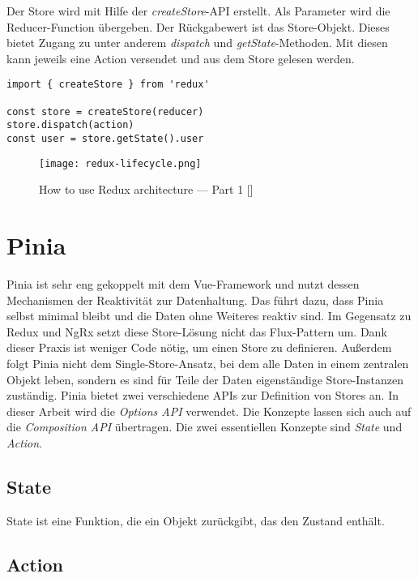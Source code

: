 Der Store wird mit Hilfe der \textit{createStore}-API erstellt. Als Parameter wird die Reducer-Function übergeben. Der Rückgabewert ist das Store-Objekt. Dieses bietet Zugang zu unter anderem \textit{dispatch} und \textit{getState}-Methoden. Mit diesen kann jeweils eine Action versendet und aus dem Store gelesen werden.

\begin{lstlisting}
import { createStore } from 'redux'

const store = createStore(reducer)
store.dispatch(action)
const user = store.getState().user
\end{lstlisting}

\begin{figure}[H]
  \texttt{[image: redux-lifecycle.png]}
  \caption{How to use Redux architecture — Part 1 [\citeyear{reduxDataFlow}]}
  \label{fig:redux-lifecycle}
\end{figure}

\section{Pinia}

Pinia ist sehr eng gekoppelt mit dem Vue-Framework und nutzt dessen Mechanismen der Reaktivität zur Datenhaltung. Das führt dazu, dass Pinia selbst minimal bleibt und die Daten ohne Weiteres reaktiv sind. Im Gegensatz zu Redux und NgRx setzt diese Store-Lösung nicht das Flux-Pattern um. Dank dieser Praxis ist weniger Code nötig, um einen Store zu definieren. Außerdem folgt Pinia nicht dem Single-Store-Ansatz, bei dem alle Daten in einem zentralen Objekt leben, sondern es sind für Teile der Daten eigenständige Store-Instanzen zuständig. Pinia bietet zwei verschiedene APIs zur Definition von Stores an. In dieser Arbeit wird die \textit{Options API} verwendet. Die Konzepte lassen sich auch auf die \textit{Composition API} übertragen.\cite{piniaDefiningAStore} Die zwei essentiellen Konzepte sind \textit{State} und \textit{Action}.

\subsection{State}

State ist eine Funktion, die ein Objekt zurückgibt, das den Zustand enthält.

\subsection{Action}

